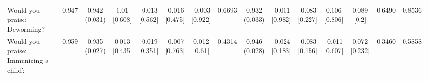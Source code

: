 {\begin{tabular}[t]{lcccccccccccccc}
\hspace{1em}Would you praise: Deworming? & 0.947 & \makecell[c]{0.942\\(0.031)} & \makecell[c]{0.01\\{[0.608]}} & \makecell[c]{-0.013\\{[0.562]}} & \makecell[c]{-0.016\\{[0.475]}} & \makecell[c]{-0.003\\{[0.922]}} & 0.6693 & \makecell[c]{0.932\\(0.033)} & \makecell[c]{-0.001\\{[0.982]}} & \makecell[c]{-0.083\\{[0.227]}} & \makecell[c]{0.006\\{[0.806]}} & \makecell[c]{0.089\\{[0.2]}} & 0.6490 & 0.8536\\
\hspace{1em}Would you praise: Immunizing a child? & 0.959 & \makecell[c]{0.935\\(0.027)} & \makecell[c]{0.013\\{[0.435]}} & \makecell[c]{-0.019\\{[0.351]}} & \makecell[c]{-0.007\\{[0.763]}} & \makecell[c]{0.012\\{[0.61]}} & 0.4314 & \makecell[c]{0.946\\(0.028)} & \makecell[c]{-0.024\\{[0.183]}} & \makecell[c]{-0.083\\{[0.156]}} & \makecell[c]{-0.011\\{[0.607]}} & \makecell[c]{0.072\\{[0.232]}} & 0.3460 & 0.5858\\
\bottomrule
\end{tabular}}


